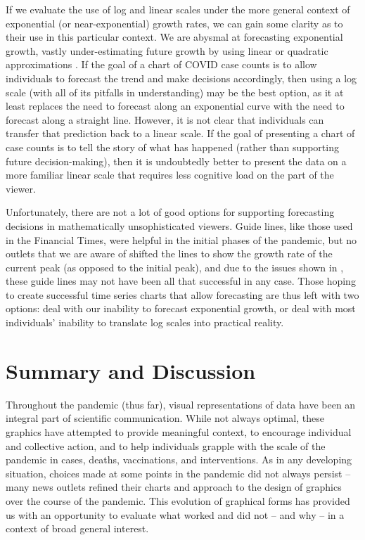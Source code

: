 \documentclass[article]{jdssv}\usepackage[]{graphicx}\usepackage[]{color}
\begin{document}
If we evaluate the use of log and linear scales under the more general context of exponential (or near-exponential) growth rates,  we can gain some clarity as to their use in this particular context. We are abysmal at forecasting exponential growth, vastly under-estimating future growth by using linear or quadratic approximations \citep{wagenaarExtrapolationExponentialTime1978a,lawrenceExploringJudgementalForecasting1992,timmersInverseStatisticsMisperception1977a}. If the goal of a chart of COVID case counts is to allow individuals to forecast the trend and make decisions accordingly, then using a log scale (with all of its pitfalls in understanding) may be the best option, as it at least replaces the need to forecast along an exponential curve with the need to forecast along a straight line. However, it is not clear that individuals can transfer that prediction back to a linear scale. If the goal of presenting a chart of case counts is to tell the story of what has happened (rather than supporting future decision-making), then it is undoubtedly better to present the data on a more familiar linear scale that requires less cognitive load on the part of the viewer. 

Unfortunately, there are not a lot of good options for supporting forecasting decisions in mathematically unsophisticated viewers. Guide lines, like those used in the Financial Times, were helpful in the initial phases of the pandemic, but no outlets that we are aware of shifted the lines to show the growth rate of the current peak (as opposed to the initial peak), and due to the issues shown in , these guide lines may not have been all that successful in any case. Those hoping to create successful time series charts that allow forecasting are thus left with two options: deal with our inability to forecast exponential growth, or deal with most individuals' inability to translate log scales into practical reality. 


\section{Summary and Discussion} \label{sec:summary}
Throughout the pandemic (thus far), visual representations of data have been an integral part of scientific communication. While not always optimal, these graphics have attempted to provide meaningful context, to encourage individual and collective action, and to help individuals grapple with the scale of the pandemic in cases, deaths, vaccinations, and interventions. As in any developing situation, choices made at some points in the pandemic did not always persist -- many news outlets refined their charts and approach to the design of graphics over the course of the pandemic. This evolution of graphical forms has provided us with an opportunity to evaluate what worked and did not -- and why -- in a context of broad general interest. 
\end{document}
